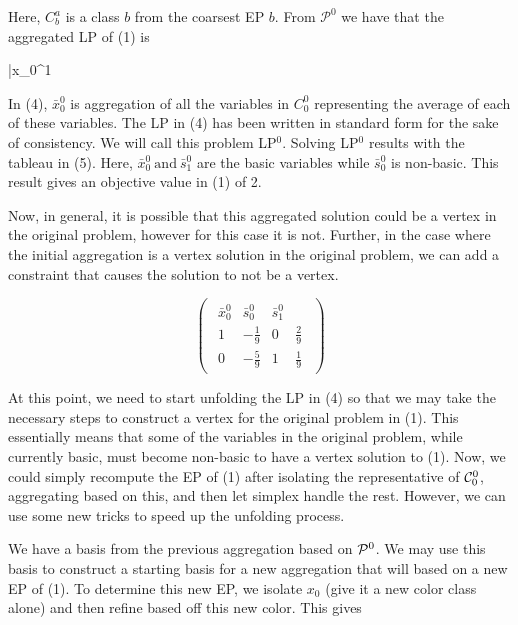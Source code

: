 \documentclass[11pt]{article} %
\newcommand{\cP}{{\cal P}}
\newcommand{\cC}{{\cal C}}
\begin{document}
	 Here, $C_b^a$ is a class $b$ from the coarsest EP $b$.  From $\mathcal{P}^0$ we have that the aggregated LP of (1) is  
 
 \begin{mini!}
 	{}{\bar{x}_0^1}{}{}
 \end{mini!}

	In (4), $\bar{x}_0^0$ is aggregation of all the variables in $C_0^0$ representing the average of each of these variables.  The LP in (4) has been written in standard form for the sake of consistency. We will call this problem LP$^0$. Solving LP$^0$ results with the tableau in (5).  Here, $\bar{x}_0^0 \ \text{and} \ \bar{s}_1^0$ are the basic variables while $\bar{s}_0^0$ is non-basic.  This result gives an objective value in (1) of 2.
	
	Now, in general, it is possible that this aggregated solution could be a vertex in the original problem, however for this case it is not.  Further, in the case where the initial aggregation is a vertex solution in the original problem, we can add a constraint that causes the solution to not be a vertex.
	
	\begin{equation}
	\begin{pmatrix}
	\begin{array}{ccc|c}
		\bar{x}_0^0 & \bar{s}_0^0 & \bar{s}_1^0 \\
		\hline
		1 & -\frac{1}{9} & 0 & \frac{2}{9} \\
		0 & -\frac{5}{9} & 1 & \frac{1}{9} 
	\end{array}
	\end{pmatrix}
	\end{equation}
	
	At this point, we need to start unfolding the LP in (4) so that we may take the necessary steps to construct a vertex for the original problem in (1).  This essentially means that some of the variables in the original problem, while currently basic, must become non-basic to have a vertex solution to (1).  Now, we could simply recompute the EP of (1) after isolating the representative of $\cC_0^0$, aggregating based on this, and then let simplex handle the rest.  However, we can use some new tricks to speed up the unfolding process.
	
	We have a basis from the previous aggregation based on $\cP^0$.  We  may use this basis to construct a starting basis for a new aggregation that will based on a new EP of (1).  To determine this new EP, we isolate $x_0$ (give it a new color class alone) and then refine based off this new color.  This gives
	
\end{document}
